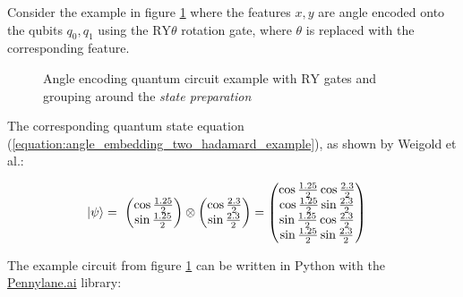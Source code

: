 Consider the example in figure \ref{fig:example_encoding_circuit_ry} where the features $x, y$ are angle encoded onto the qubits $q_0, q_1$ using the $\mathrm{RY}\theta$ rotation gate, where $\theta$ is replaced with the corresponding feature. 

\begin{figure}[!h]
    \centering
    \caption{Angle encoding quantum circuit example with $\mathrm{RY}$ gates and grouping around the \textit{state preparation}}
    \label{fig:example_encoding_circuit_ry}
\end{figure}

The corresponding quantum state equation (\ref{equation:angle_embedding_two_hadamard_example}), as shown by Weigold et al.\cite{Weigold2021_ExpandingDataEncodingPatterns}:

\begin{equation}
    \centering
    \begin{split}
        \ket{\psi} &=\ \begin{pmatrix}\cos{\frac{1.25}{2}} \\ \sin{\frac{1.25}{2}}\end{pmatrix} \otimes \begin{pmatrix}\cos{\frac{2.3}{2}} \\ \sin{\frac{2.3}{2}}\end{pmatrix} = \begin{pmatrix}
            \cos{\frac{1.25}{2}}\cos{\frac{2.3}{2}}\\
            \cos{\frac{1.25}{2}}\sin{\frac{2.3}{2}}\\
            \sin{\frac{1.25}{2}}\cos{\frac{2.3}{2}}\\
            \sin{\frac{1.25}{2}}\sin{\frac{2.3}{2}}
        \end{pmatrix}
    \end{split}
    \label{equation:angle_embedding_two_hadamard_example}
\end{equation}

\par
\noindent The example circuit from figure \ref{fig:example_encoding_circuit_ry} can be written in Python with the \href{https://www.pennylane.ai}{Pennylane.ai} library:

